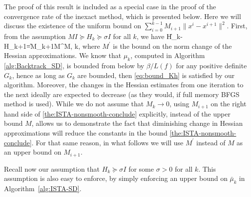\documentclass[11pt]{article}
\numberwithin{equation}{section}
\begin{document}
The proof of this result is included as a special case in the proof of the convergence rate of the inexact method, which is presented below. 
Here we will discuss the existence of the uniform bound on $\sum_{i=0}^{k-1}M_{i+1}\| x^i-x^{i+1}\|^2$.
First, from the assumption $M I \succeq H_k\succeq \sigma I$ for all $k$, we have  
\bea\label{eq:bound_Kh}
\|H_k-H_{k+1}\|=M_{k+1}\leq M^\prime\leq M, \quad \forall k,
\eea
where $M^\prime$ is the bound on the norm change of the Hessian approximations. 
 We know that 
  $\mu_k$, computed in Algorithm \ref{alg:Backtrack_SD}, is bounded from below by $\beta/L(f)$ for any positive definite $G_k$, hence as long as $G_k$ are bounded, then
 \eqref{eq:bound_Kh}  is satisfied by our algorithm.  Moreover, the changes in the Hessian estimates from one iteration to the next ideally are  expected to decrease (as they would, if full memory BFGS method is used). While we do not assume that $M_k\to 0$, using  $M_{i+1}$ on the right hand side of \eqref{the:ISTA-nonsmooth-conclude} explicitly, instead of the upper bound $M$, allows us to demonstrate the fact that diminishing change in Hessian approximations will reduce the constants in the bound \eqref{the:ISTA-nonsmooth-conclude}. For that same reason, in what follows we will use $M^\prime$ instead of $M$ as an upper bound on $M_{i+1}$.
  
 Recall now our assumption that  $H_k\succeq \sigma I$ for some $\sigma>0$ for all $k$. This assumption is also easy to enforce, by simply enforcing an upper bound on $\bar \mu_k$ in Algorithm~\ref{alg:ISTA-SD}.
\end{document}
